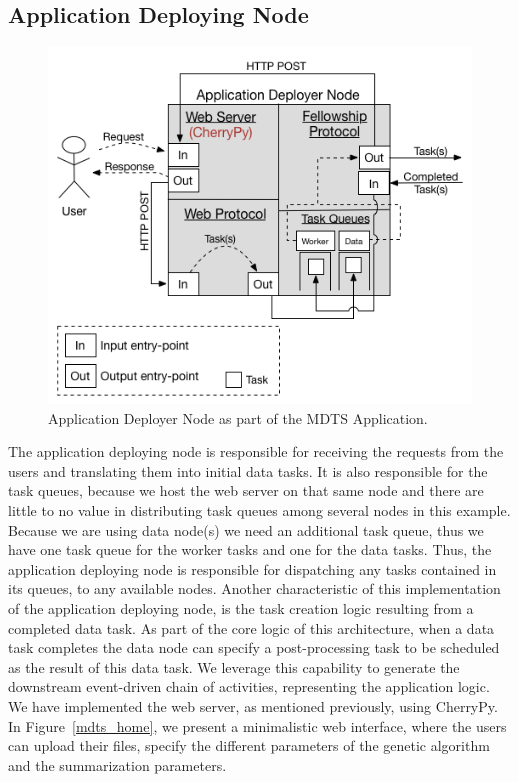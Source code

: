 \documentclass[12pt, titlepage]{uo_temp}
\begin{document}
     \subsection{Application Deploying Node}
     \begin{figure}[h!]
       \centering
       \includegraphics[width=125mm]{images/mdts_app_dep.png}
       \caption{Application Deployer Node as part of the MDTS Application.}
     \end{figure}

     The application deploying node is responsible for receiving the requests from the
     users and translating them into initial data tasks. It is also responsible for the
     task queues, because we host the web server on that same node and there are little to
     no value in distributing task queues among several nodes in this example. Because we
     are using data node(s) we need an additional task queue, thus we have one task queue
     for the worker tasks and one for the data tasks. Thus, the application deploying node
     is responsible for dispatching any tasks contained in its queues, to any
     available nodes.
     Another characteristic of this implementation of the application deploying node, is
     the task creation logic resulting from a completed data task. As part of the core
     logic of this architecture, when a data task completes the data node can specify a
     post-processing task to be scheduled as the result of this data task. We leverage
     this capability to generate the downstream event-driven chain of activities,
     representing the application logic.
     We have implemented the web server, as mentioned previously, using CherryPy. In
     Figure~\ref{mdts_home}, we present a minimalistic web interface, where the users can
     upload their files, specify the different parameters of the genetic algorithm and the
     summarization parameters.
\end{document}
